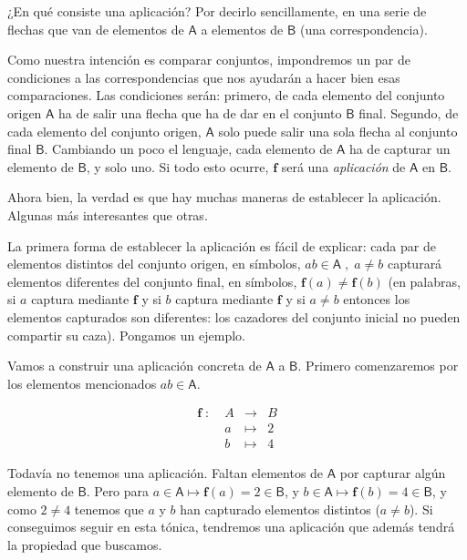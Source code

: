 \documentclass{amsart}
\theoremstyle{definition}
\theoremstyle{remark}
\numberwithin{equation}{section}
\newcommand{\fromto}{\longrightarrow}
\newcommand{\setsymbol}[1]{\textsf{#1}}
\newcommand{\sA}{\setsymbol{A}}
\newcommand{\sB}{\setsymbol{B}}
\newcommand{\monrel}[1]{\mathbf{#1}}
\newcommand{\funct}[1]{\monrel{#1}}
\newcommand{\functat}[2]{\funct{#1}{\left({#2}\right)}}
\begin{document}
	
	¿En qué consiste una aplicación? Por decirlo sencillamente, en una serie 
de flechas que van de elementos de $\sA$ a elementos de $\sB$ (una 
correspondencia).
	
	
	Como nuestra intención es comparar conjuntos, impondremos un par de 
condiciones a las correspondencias que nos ayudarán a hacer bien esas 
comparaciones. Las condiciones serán: primero, de cada elemento del conjunto 
origen $\sA$ ha de salir una flecha que ha de dar en el conjunto $\sB$ final. 
Segundo, de cada elemento del conjunto origen, $\sA$ solo puede salir una 
sola flecha al conjunto final $\sB$. Cambiando un poco el lenguaje, cada 
elemento de $\sA$ ha de capturar un elemento de $\sB$, y solo uno. Si todo 
esto ocurre, $\funct{f}$ será una \emph{aplicación} de $\sA$ en $\sB$.
	
	
	
	Ahora bien, la verdad es que hay muchas maneras de establecer la 
aplicación. Algunas más interesantes que otras.
	
	
	La primera forma de establecer la aplicación es fácil de explicar: cada 
par de elementos distintos del conjunto origen, en símbolos, $a b \in \sA 
\;,\; a \neq b$ capturará elementos diferentes del conjunto final, en 
símbolos, $\funct{f}(a) \neq \funct{f}(b)$ (en palabras, si $a$ captura 
mediante $\funct{f}$ y si $b$ captura mediante $\funct{f}$ y si $a \neq b$ 
entonces los elementos capturados son diferentes: los cazadores del conjunto 
inicial no pueden compartir su caza). Pongamos un ejemplo.
	
	
	Vamos a construir una aplicación concreta de $\sA$ a $\sB$. Primero 
comenzaremos por los elementos mencionados $a b \in \sA$.
	
	$$
	\begin{matrix}
		\funct{f}\; :\;   & A & \fromto & B \\
		{}  & a & \mapsto & 2 \\
		{}  & b & \mapsto & 4
	\end{matrix}
	$$
	
	
	Todavía no tenemos una aplicación. Faltan elementos de $\sA$ por capturar 
algún elemento de $\sB$. Pero para $a \in \sA \mapsto \functat{f}{a} = 2 \in 
\sB$, y $b\in \sA \mapsto \functat{f}{b} = 4 \in \sB$, y como $2 \neq 4$ 
tenemos que $a$ y $b$ han capturado elementos distintos ($a \neq b$). Si 
conseguimos seguir en esta tónica, tendremos una aplicación que además tendrá 
la propiedad que buscamos.
	
\end{document}
